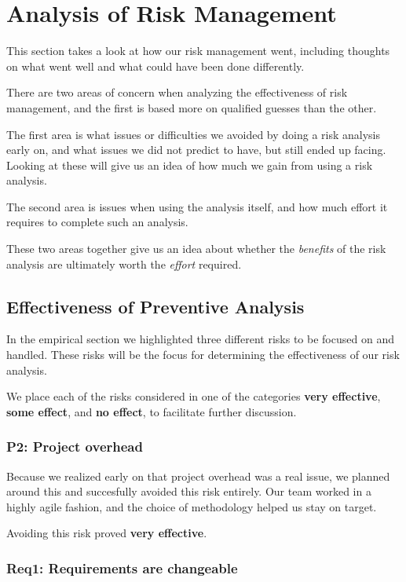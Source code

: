 \section{Analysis of Risk Management}
This section takes a look at how our risk management went, including thoughts on what went well and what could have been done differently.
\label{sec:AnalysisRiskManagement}

There are two areas of concern when analyzing the effectiveness of risk management, and the first is
based more on qualified guesses than the other.

The first area is what issues or difficulties we avoided by doing a risk analysis early on, and what
issues we did not predict to have, but still ended up facing. Looking at these will give us an idea
of how much we gain from using a risk analysis.

The second area is issues when using the analysis itself, and how much effort it requires to complete
such an analysis.

These two areas together give us an idea about whether the \emph{benefits} of the risk analysis are
ultimately worth the \emph{effort} required.

\subsection{Effectiveness of Preventive Analysis}

In the empirical section we highlighted three different risks to be focused on and handled. These risks
will be the focus for determining the effectiveness of our risk analysis.

We place each of the risks considered in one of the categories \textbf{very effective}, \textbf{some
effect}, and \textbf{no effect}, to facilitate further discussion.

\subsubsection{P2: Project overhead}

Because we realized early on that project overhead was a real issue, we planned around this and succesfully
avoided this risk entirely. Our team worked in a highly agile fashion, and the choice of methodology helped
us stay on target.

Avoiding this risk proved \textbf{very effective}.

\subsubsection{Req1: Requirements are changeable}

